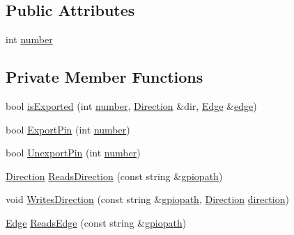 \subsection*{Public Attributes}
\begin{DoxyCompactItemize}
\item 
int \hyperlink{class_hardware_1_1_g_p_i_o_a1671a87bb70911b0a6a29019a068cf96}{number}
\end{DoxyCompactItemize}
\subsection*{Private Member Functions}
\begin{DoxyCompactItemize}
\item 
bool \hyperlink{class_hardware_1_1_g_p_i_o_a423f9ac92259cacdca0c82c3ee9b1cdd}{is\+Exported} (int \hyperlink{class_hardware_1_1_g_p_i_o_a1671a87bb70911b0a6a29019a068cf96}{number}, \hyperlink{class_hardware_1_1_g_p_i_o_a7507431d6341c146f22dcdb21b78ffd4}{Direction} \&dir, \hyperlink{class_hardware_1_1_g_p_i_o_a9a7595aabdac9aec75f22e8b86342162}{Edge} \&\hyperlink{class_hardware_1_1_g_p_i_o_adf15f74f053069029e99934e28c109e0}{edge})
\item 
bool \hyperlink{class_hardware_1_1_g_p_i_o_a1a880bee633c9c5227cb36d2d6c63a52}{Export\+Pin} (int \hyperlink{class_hardware_1_1_g_p_i_o_a1671a87bb70911b0a6a29019a068cf96}{number})
\item 
bool \hyperlink{class_hardware_1_1_g_p_i_o_ad56e9d73869a8dacc3245e33df4f5d24}{Unexport\+Pin} (int \hyperlink{class_hardware_1_1_g_p_i_o_a1671a87bb70911b0a6a29019a068cf96}{number})
\item 
\hyperlink{class_hardware_1_1_g_p_i_o_a7507431d6341c146f22dcdb21b78ffd4}{Direction} \hyperlink{class_hardware_1_1_g_p_i_o_a875d4f95ff3e6a70196660faa0477cf5}{Reads\+Direction} (const string \&\hyperlink{class_hardware_1_1_g_p_i_o_ac47062ed6aba52b9e8506e1575bf5061}{gpiopath})
\item 
void \hyperlink{class_hardware_1_1_g_p_i_o_a73426139a22b7e489a9c402678a477e4}{Writes\+Direction} (const string \&\hyperlink{class_hardware_1_1_g_p_i_o_ac47062ed6aba52b9e8506e1575bf5061}{gpiopath}, \hyperlink{class_hardware_1_1_g_p_i_o_a7507431d6341c146f22dcdb21b78ffd4}{Direction} \hyperlink{class_hardware_1_1_g_p_i_o_a77e93e4f6650507fdc4898d272d540e7}{direction})
\item 
\hyperlink{class_hardware_1_1_g_p_i_o_a9a7595aabdac9aec75f22e8b86342162}{Edge} \hyperlink{class_hardware_1_1_g_p_i_o_ac5a3c6d1a0ce58a0b2ee0752623810e4}{Reads\+Edge} (const string \&\hyperlink{class_hardware_1_1_g_p_i_o_ac47062ed6aba52b9e8506e1575bf5061}{gpiopath})

\end{DoxyCompactItemize}
